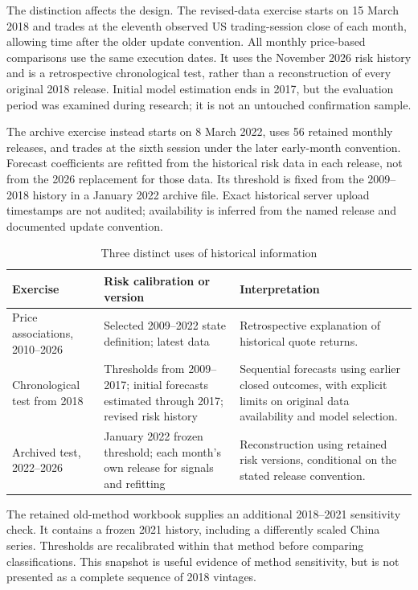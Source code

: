 The distinction affects the design. The revised-data exercise starts on 15 March 2018 and trades at the eleventh observed US trading-session close of each month, allowing time after the older update convention. All monthly price-based comparisons use the same execution dates. It uses the November 2026 risk history and is a retrospective chronological test, rather than a reconstruction of every original 2018 release. Initial model estimation ends in 2017, but the evaluation period was examined during research; it is not an untouched confirmation sample.

The archive exercise instead starts on 8 March 2022, uses 56 retained monthly releases, and trades at the sixth session under the later early-month convention. Forecast coefficients are refitted from the historical risk data in each release, not from the 2026 replacement for those data. Its threshold is fixed from the 2009–2018 history in a January 2022 archive file. Exact historical server upload timestamps are not audited; availability is inferred from the named release and documented update convention.

\begin{table}[!htbp]
\centering\small
\caption{Three distinct uses of historical information}
\label{tab:timing}
\begin{tabular}{@{}P{35mm}P{50mm}P{63mm}@{}}
\toprule
Exercise & Risk calibration or version & Interpretation \\
\midrule
Price associations, 2010–2026 & Selected 2009–2022 state definition; latest data & Retrospective explanation of historical quote returns. \\
Chronological test from 2018 & Thresholds from 2009–2017; initial forecasts estimated through 2017; revised risk history & Sequential forecasts using earlier closed outcomes, with explicit limits on original data availability and model selection. \\
Archived test, 2022–2026 & January 2022 frozen threshold; each month's own release for signals and refitting & Reconstruction using retained risk versions, conditional on the stated release convention. \\
\bottomrule
\end{tabular}
\end{table}

The retained old-method workbook supplies an additional 2018–2021 sensitivity check. It contains a frozen 2021 history, including a differently scaled China series. Thresholds are recalibrated within that method before comparing classifications. This snapshot is useful evidence of method sensitivity, but is not presented as a complete sequence of 2018 vintages.

